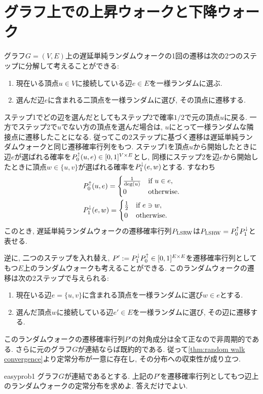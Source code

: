 \section{グラフ上での上昇ウォークと下降ウォーク} \label{sec:graph up and down walk}
グラフ$G=(V,E)$上の遅延単純ランダムウォークの1回の遷移は次の2つのステップに分解して考えることができる:
\begin{enumerate}
  \item 現在いる頂点$u\in V$に接続している辺$e \in E$を一様ランダムに選ぶ.
  \item 選んだ辺$e$に含まれる二頂点を一様ランダムに選び, その頂点に遷移する.
\end{enumerate}
ステップ1でどの辺を選んだとしてもステップ2で確率$1/2$で元の頂点$u$に戻る.
一方でステップ2で$u$でない方の頂点を選んだ場合は, $u$にとって一様ランダムな隣接点に遷移したことになる.
従ってこの2ステップに基づく遷移は遅延単純ランダムウォークと同じ遷移確率行列をもつ.
ステップ1を頂点$u$から開始したときに辺$e$が選ばれる確率を$P^{\uparrow}_0(u,e) \in [0,1]^{V \times E}$とし,
同様にステップ2を辺$e$から開始したときに頂点$w \in \{u,v\}$が選ばれる確率を$P^{\downarrow}_1(e,w)$とする.
すなわち
\begin{align*}
   & P^{\uparrow}_0(u,e) = \begin{cases}
                     \frac{1}{\deg(u)} & \text{if }u \in e, \\
                     0                 & \text{otherwise}.
                   \end{cases} \\
   & P^{\downarrow}_1(e,w) = \begin{cases}
                       \frac{1}{2} & \text{if }e \ni w, \\
                       0           & \text{otherwise}.
                     \end{cases}
\end{align*}
このとき, 遅延単純ランダムウォークの遷移確率行列$P_{\mathrm{LSRW}}$は$P_{\mathrm{LSRW}} = P^{\uparrow}_0 P^{\downarrow}_1$と表せる.

逆に, 二つのステップを入れ替え, $P'\mathrel{:=} P^{\downarrow}_1 P^{\uparrow}_0 \in [0,1]^{E\times E}$を遷移確率行列としてもつ$E$上のランダムウォークも考えることができる.
このランダムウォークの遷移は次の2ステップで与えられる:
\begin{enumerate}
  \item 現在いる辺$e = \{u,v\}$に含まれる頂点を一様ランダムに選び$w \in e$とする.
  \item 選んだ頂点$w$に接続している辺$e'\in E$を一様ランダムに選び, その辺に遷移する.
\end{enumerate}
このランダムウォークの遷移確率行列$P'$の対角成分は全て正なので非周期的である.
さらに元のグラフ$G$が連結ならば既約的である.
従って\cref{thm:random walk convergence}より定常分布が一意に存在し, その分布への収束性が成り立つ.
%
\begin{exercise}{easy}{prob1}
  グラフ$G$が連結であるとする.
  上記の$P'$を遷移確率行列としてもつ辺上のランダムウォークの定常分布を求めよ.
  答えだけでよい.
\end{exercise}
%

